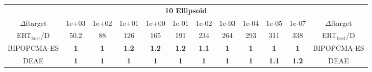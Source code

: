 \begin{tabular}{cccccccccccc}
 & \multicolumn{10}{c}{{\normalsize \textbf{10 Ellipsoid}}}\\
$\Delta$ftarget& 1e+03& 1e+02& 1e+01& 1e+00& 1e-01& 1e-02& 1e-03& 1e-04& 1e-05& 1e-07 & $\Delta$ftarget \\
ERT$_{\textrm{best}}$/D& 50.2& 88& 126& 165& 191& 234& 264& 293& 311& 338 & ERT$_{\textrm{best}}$/D \\
\hline
BIPOPCMA-ES & \textbf{1} & \textbf{1} & \textbf{1.2} & \textbf{1.2} & \textbf{1.2} & \textbf{1.1} & \textbf{1} & \textbf{1} & \textbf{1} & \textbf{1} & BIPOPCMA-ES \cite{add_an_entry_for_BIPOPCMA-ES_in_bbob.bib}\\
DEAE & \textbf{1} & \textbf{1} & \textbf{1} & \textbf{1} & \textbf{1} & \textbf{1} & \textbf{1} & \textbf{1} & \textbf{1.1} & \textbf{1.2} & DEAE \cite{add_an_entry_for_DEAE_in_bbob.bib}
\end{tabular}
